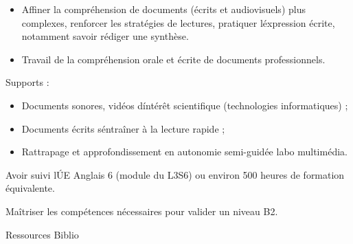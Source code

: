 {
\begin{itemize} 
\item Affiner la compréhension de documents (écrits et audiovisuels) plus
complexes, renforcer les stratégies de lectures, pratiquer l\'expression
écrite, notamment savoir rédiger une synthèse.
\item Travail de la compréhension orale et écrite de documents professionnels.
\end{itemize} 
Supports :
\begin{itemize} 
\item Documents sonores, vidéos d\'intérêt scientifique (technologies informatiques) ;
\item Documents écrits s\'entraîner à la lecture rapide ;
\item Rattrapage et approfondissement en autonomie semi-guidée labo multimédia.
\end{itemize} 
} 
{Avoir suivi l\'UE Anglais 6 (module du L3S6) ou environ 500 heures de
formation équivalente.} 
{\begin{itemize} 
  \ObjItem Maîtriser les compétences nécessaires pour valider un niveau B2. 
\end{itemize} 
} 
{Ressources} 
{Biblio} 
 
\vfill

